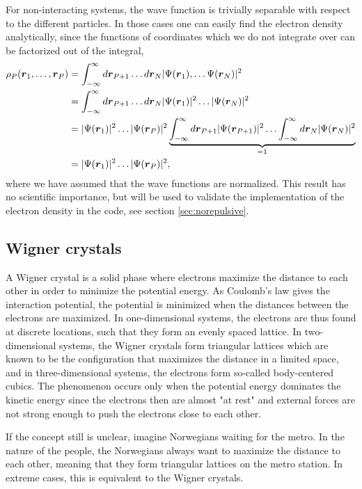 For non-interacting systems, the wave function is trivially separable with respect to the different particles. In those cases one can easily find the electron density analytically, since the functions of coordinates which we do not integrate over can be factorized out of the integral,
\begin{equation}
\begin{aligned}
\rho_P(\boldsymbol{{r}}_1,\hdots,\boldsymbol{{r}}_P)&=\int_{-\infty}^{\infty}d\boldsymbol{{r}}_{P+1}\hdots d\boldsymbol{{r}}_N |\Psi(\boldsymbol{{r}}_1),\hdots \Psi(\boldsymbol{{r}}_N)|^2\\
&=\int_{-\infty}^{\infty}d\boldsymbol{{r}}_{P+1}\hdots d\boldsymbol{{r}}_N |\Psi(\boldsymbol{{r}}_1)|^2\hdots |\Psi(\boldsymbol{{r}}_N)|^2\\
&=|\Psi(\boldsymbol{{r}}_1)|^2\hdots |\Psi(\boldsymbol{{r}}_P)|^2\underbrace{\int_{-\infty}^{\infty}d\boldsymbol{{r}}_{P+1}|\Psi(\boldsymbol{{r}}_{P+1})|^2\hdots\int_{-\infty}^{\infty}d\boldsymbol{{r}}_{N}|\Psi(\boldsymbol{{r}}_{N})|^2}_{=1}\\
&=|\Psi(\boldsymbol{{r}}_1)|^2\hdots |\Psi(\boldsymbol{{r}}_P)|^2,
\end{aligned}
\end{equation}
where we have assumed that the wave functions are normalized. This result has no scientific importance, but will be used to validate the implementation of the electron density in the code, see section \ref{sec:norepulsive}.

\subsection{Wigner crystals} \label{sec:wigner}
A Wigner crystal is a solid phase where electrons maximize the distance to each other in order to minimize the potential energy. As Coulomb's law gives the interaction potential, the potential is minimized when the distances between the electrons are maximized. In one-dimensional systems, the electrons are thus found at discrete locations, such that they form an evenly spaced lattice. In two-dimensional systems, the Wigner crystals form triangular lattices which are known to be the configuration that maximizes the distance in a limited space, and in three-dimensional systems, the electrons form so-called body-centered cubics. The phenomenon occurs only when the potential energy dominates the kinetic energy since the electrons then are almost "at rest" and external forces are not strong enough to push the electrons close to each other. 

If the concept still is unclear, imagine Norwegians waiting for the metro. In the nature of the people, the Norwegians always want to maximize the distance to each other, meaning that they form triangular lattices on the metro station. In extreme cases, this is equivalent to the Wigner crystals.


